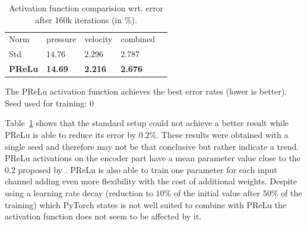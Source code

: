\documentclass[acmtog]{techreportacmart}
\begin{document}
\begin{table}[h]
\caption{Activation function comparision wrt. error \\ after 160k iterations (in \%).}
\label{tab:three}
\begin{center}
\begin{tabular}{l|l|l|l|l}
  \toprule
  Norm   & pressure   &	velocity    & combined \\
  Std	 & 14.76	  & 2.296		&  2.787   \\
  \bf PReLu	 & \bf 14.69	  & \bf 2.216		& \bf 2.676	   \\
  \bottomrule
\end{tabular}
\end{center}
\bigskip\centering
\footnotesize The PReLu activation function achieves  
the best error rates (lower is better). \\
Seed used for training: $0$
\end{table}%

Table~\ref{tab:three} shows that the standard setup could not achieve a better result while PReLu 
is able to reduce its error by $0.2\%$. These results were obtained with a single seed and therefore 
may not be that conclusive but rather indicate a trend. PReLu activations on the encoder part have 
a mean parameter value close to the $0.2$ proposed by \cite{Thuerey20}. PReLu is also able to train 
one parameter for each input channel adding even more flexibility with the cost of additional weights. 
Despite \cite{Thuerey20} using a learning rate decay (reduction to $10\%$ of the initial value after 
$50\%$ of the training) which PyTorch states is not well suited to combine with PReLu the 
activation function does not seem to be affected by it.
\end{document}
